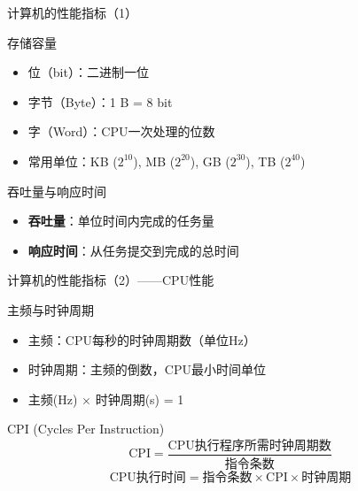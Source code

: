 \documentclass[10pt, aspectratio=169]{beamer}
\begin{document}
\begin{frame}{计算机的性能指标（1）}
    \begin{block}{存储容量}
        \begin{itemize}
            \item 位（bit）：二进制一位
            \item 字节（Byte）：1 B = 8 bit
            \item 字（Word）：CPU一次处理的位数
            \item 常用单位：KB ($2^{10}$), MB ($2^{20}$), GB ($2^{30}$), TB ($2^{40}$)
        \end{itemize}
    \end{block}
    \begin{block}{吞吐量与响应时间}
        \begin{itemize}
        \item \textbf{吞吐量}：单位时间内完成的任务量
        \item \textbf{响应时间}：从任务提交到完成的总时间
        \end{itemize}
    \end{block}
\end{frame}

\begin{frame}{计算机的性能指标（2）——CPU性能}
    \begin{block}{主频与时钟周期}
        \begin{itemize}
        \item 主频：CPU每秒的时钟周期数（单位Hz）
        \item 时钟周期：主频的倒数，CPU最小时间单位
        \item 主频(Hz) $\times$ 时钟周期(s) = 1
        \end{itemize}
    \end{block}
    \begin{block}{CPI (Cycles Per Instruction)}
        \[
            \text{CPI} = \frac{\text{CPU执行程序所需时钟周期数}}{\text{指令条数}}
        \]
        \[
            \text{CPU执行时间} = \text{指令条数} \times \text{CPI} \times \text{时钟周期}
        \]
    \end{block}
\end{frame}
\end{document}
